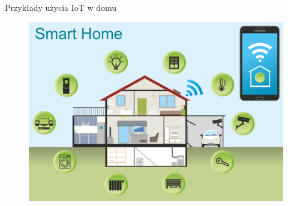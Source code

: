 \documentclass{beamer}
\begin{document}
\begin{frame}{Przykłady użycia IoT w domu}
    \begin{figure}[H!]
        \centering
        \includegraphics[width=\textwidth]{shome.png}
        \label{fig:my_label}
    \end{figure}
\end{frame}
\end{document}
